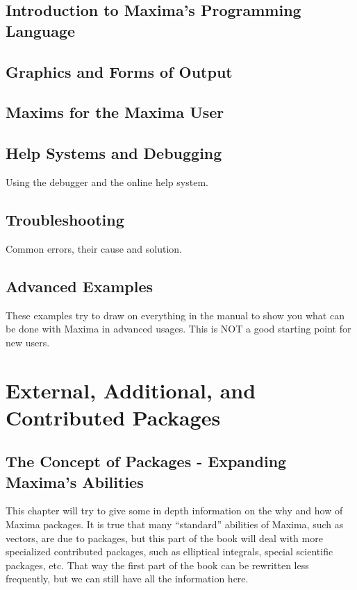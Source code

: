 \documentclass[oneside,english]{book}
\begin{document}
\chapter{Introduction to Maxima's Programming Language}
  


\chapter{Graphics and Forms of Output}

  

\chapter{Maxims for the Maxima User}
  

\chapter{Help Systems and Debugging}

    Using the debugger and the online help system.

\chapter{Troubleshooting}

    Common errors, their cause and solution.

\chapter{Advanced Examples}

    These examples try to draw on everything in the manual to show you
    what can be done with Maxima in advanced usages. 
    This is NOT a good starting point for new users.

   

\part{External, Additional, and Contributed Packages}


\chapter{The Concept of Packages - Expanding Maxima's Abilities}

    This chapter will try to give some in depth information on the why
    and how of Maxima packages. It is true that many {}``standard''
    abilities of Maxima, such as vectors, are due to packages, but this
    part of the book will deal with more specialized contributed packages,
    such as elliptical integrals, special scientific packages, etc. That
    way the first part of the book can be rewritten less frequently, but
    we can still have all the information here.
\end{document}
